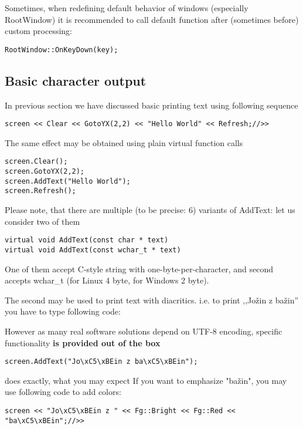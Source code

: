 Sometimes, when redefining default behavior of windows (especially
RootWindow) it is recommended to call default function after (sometimes
before) custom processing:\vspace{-10pt}
\begin{verbatim}
RootWindow::OnKeyDown(key);
\end{verbatim}

\vspace{\fill}
\pagebreak
\subsection {Basic character output}

In previous section we have discussed basic printing text
using following sequence
\begin{lstlisting}
screen << Clear << GotoYX(2,2) << "Hello World" << Refresh;//>>
\end{lstlisting}

The same effect may be obtained using plain virtual function calls
\begin{lstlisting}
screen.Clear();
screen.GotoYX(2,2);
screen.AddText("Hello World");
screen.Refresh();
\end{lstlisting}


Please note, that there are multiple (to be precise: 6) variants of
AddText: let us consider two of them
\begin{lstlisting}
virtual void AddText(const char * text)   
virtual void AddText(const wchar_t * text) 
\end{lstlisting}

One of them accept C-style string with one-byte-per-character, and
second accepts wchar\_t (for Linux 4 byte, for Windows 2 byte). 

The second may be used to print text with diacritics. i.e. to print
,,Jožin z bažin'' you have to type following code:



However as many real software solutions depend on UTF-8 encoding,
specific functionality \textbf{is provided out of the box} 
\begin{lstlisting}
screen.AddText("Jo\xC5\xBEin z ba\xC5\xBEin");
\end{lstlisting}
does exactly, what you may expect
If you want to emphasize "bažin", you may use following code to add colors:
\begin{lstlisting}
screen << "Jo\xC5\xBEin z " << Fg::Bright << Fg::Red << "ba\xC5\xBEin";//>>
\end{lstlisting}


